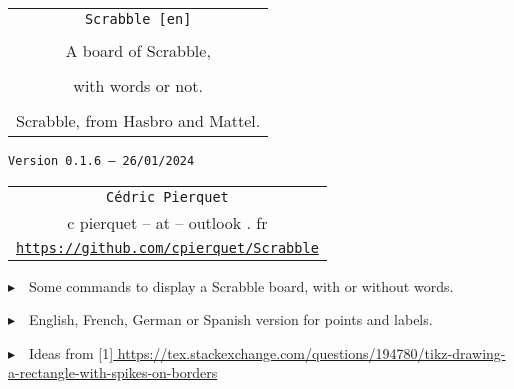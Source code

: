 \documentclass{article}
\def\TPversion{0.1.6}
\def\TPdate{26/01/2024}
\begin{document}
\pagestyle{fancy}

\thispagestyle{empty}

\vspace{2cm}

\begin{center}
	\begin{minipage}{0.75\linewidth}
	\begin{tcolorbox}[colframe=yellow,colback=yellow!15]
		\begin{center}
			\begin{tabular}{c}
				{\Huge \texttt{Scrabble [en]}}\\
				\\
				{\LARGE A board of Scrabble,} \\
				\\
				{\LARGE with words or not.} \\
				\\
				{Scrabble\texttrademark{}, from Hasbro\texttrademark{} and Mattel\texttrademark{}.}
			\end{tabular}
			
			\medskip
			
			{\small \texttt{Version \TPversion{} -- \TPdate}}
		\end{center}
	\end{tcolorbox}
\end{minipage}
\end{center}

\vspace{0.5cm}

\begin{center}
	\begin{tabular}{c}
	\texttt{Cédric Pierquet}\\
	{\ttfamily c pierquet -- at -- outlook . fr}\\
	\texttt{\url{https://github.com/cpierquet/Scrabble}}
\end{tabular}
\end{center}

\vspace{0.5cm}

{$\blacktriangleright$~~Some commands to display a Scrabble board, with or without words.}

\smallskip

{$\blacktriangleright$~~English, French, German or Spanish version for points and labels.}

\smallskip

{$\blacktriangleright$~~Ideas from \scalebox{0.8}[1]{\ttfamily\url{ https://tex.stackexchange.com/questions/194780/tikz-drawing-a-rectangle-with-spikes-on-borders}}}
\end{document}
